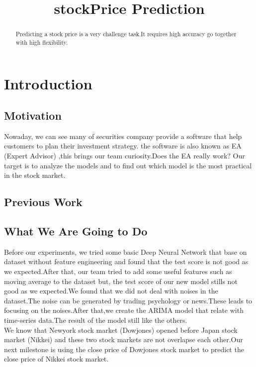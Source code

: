 \documentclass{article}
\title{stockPrice Prediction}
\begin{document}
%
\maketitle
%
\begin{abstract}
Predicting a stock price is a very challenge task.It requires high accuracy go together with high flexibility.
\end{abstract}

\section{Introduction}\label{sec:intro}

\subsection{Motivation}

Nowaday, we can see many of securities company provide a software that help customers to plan their investment strategy.
the software is also known as EA (Expert Advisor) ,this brings our team curiosity.Does the EA really work? Our target is to analyze the models and to find out which model is the most practical in the stock market.

\subsection{Previous Work}


\subsection{What We Are Going to Do}

Before our experiments, we tried some basic Deep Neural Network that base on dataset without feature engineering and found that the test score is not good as we expected.After that, our team tried to add some useful features such as moving average to the dataset but, the test score of our new model stills not good as we expected.We found that we did not deal with noises in the dataset.The noise can be generated by trading psychology or news.These leads to focusing on the noises.After that,we create the ARIMA model that relate with time-series data.The result of the model still like the others.\\We know that Newyork stock market (Dowjones) opened before Japan stock market (Nikkei) and these two stock markets are not overlapse each other.Our next milestone is using the close price of Dowjones stock market to predict the close price of Nikkei stock market.
\end{document}
